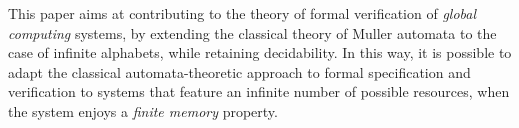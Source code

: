 


This paper aims at contributing to the theory of formal verification of \emph{global computing} systems, by extending the classical theory of Muller automata to the case of infinite alphabets, while retaining decidability. In this way, it is possible to adapt the classical automata-theoretic approach to formal specification and verification \cite{ClarkeS01} to systems that feature an infinite number of possible resources, when the system enjoys a \emph{finite memory} property. 

